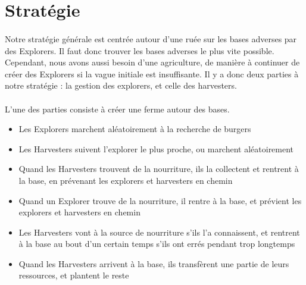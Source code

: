 \documentclass{article}
\begin{document}
\section{Stratégie}

\paragraph{}

Notre stratégie générale est centrée autour d'une ruée sur les bases adverses par des Explorers.
Il faut donc trouver les bases adverses le plus vite possible.
Cependant, nous avons aussi besoin d'une agriculture, de manière à continuer de créer des Explorers si la vague initiale est insuffisante.
Il y a donc deux parties à notre stratégie : la gestion des explorers, et celle des harvesters.

\paragraph{}
L'une des parties consiste à créer une ferme autour des bases.
\begin{itemize}
	\item Les Explorers marchent aléatoirement à la recherche de burgers
        \item Les Harvesters suivent l'explorer le plus proche, ou marchent aléatoirement
        \item Quand les Harvesters trouvent de la nourriture, ils la collectent et rentrent à la base, en prévenant les explorers et harvesters en chemin
        \item Quand un Explorer trouve de la nourriture, il rentre à la base, et prévient les explorers et harvesters en chemin
        \item Les Harvesters vont à la source de nourriture s'ils l'a connaissent, et rentrent à la base au bout d'un certain temps s'ils ont errés pendant trop longtemps
        \item Quand les Harvesters arrivent à la base, ils transfèrent une partie de leurs ressources, et plantent le reste
\end{itemize}
\end{document}
